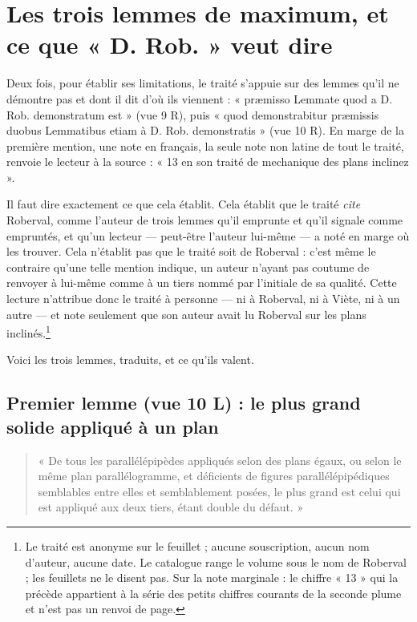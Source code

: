 \documentclass[11pt,a4paper]{article}
\begin{document}
\section*{Les trois lemmes de maximum, et ce que « D. Rob. » veut dire}

Deux fois, pour établir ses limitations, le traité s'appuie sur des lemmes qu'il
ne démontre pas et dont il dit d'où ils viennent : « præmisso Lemmate quod a
D. Rob. demonstratum est » (vue 9 R), puis « quod demonstrabitur præmissis
duobus Lemmatibus etiam à D. Rob. demonstratis » (vue 10 R). En marge de la
première mention, une note en français, la seule note non latine de tout le
traité, renvoie le lecteur à la source : « 13 en son traité de mechanique des
plans inclinez ».

Il faut dire exactement ce que cela établit. Cela établit que le traité
\emph{cite} Roberval, comme l'auteur de trois lemmes qu'il emprunte et qu'il
signale comme empruntés, et qu'un lecteur — peut-être l'auteur lui-même — a noté
en marge où les trouver. Cela n'établit pas que le traité soit de Roberval :
c'est même le contraire qu'une telle mention indique, un auteur n'ayant pas
coutume de renvoyer à lui-même comme à un tiers nommé par l'initiale de sa
qualité. Cette lecture n'attribue donc le traité à personne — ni à Roberval, ni
à Viète, ni à un autre — et note seulement que son auteur avait lu Roberval sur
les plans inclinés.\footnote{Le traité est anonyme sur le feuillet ; aucune
souscription, aucun nom d'auteur, aucune date. Le catalogue range le volume sous
le nom de Roberval ; les feuillets ne le disent pas. Sur la note marginale : le
chiffre « 13 » qui la précède appartient à la série des petits chiffres courants
de la seconde plume et n'est pas un renvoi de page.}

Voici les trois lemmes, traduits, et ce qu'ils valent.

\subsection*{Premier lemme (vue 10 L) : le plus grand solide appliqué à un plan}

\begin{quote}
« De tous les parallélépipèdes appliqués selon des plans égaux, ou selon le même
plan parallélogramme, et déficients de figures parallélépipédiques semblables
entre elles et semblablement posées, le plus grand est celui qui est appliqué
aux deux tiers, étant double du défaut. »
\end{quote}
\end{document}
